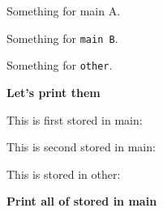 \documentclass{article}
\begin{document}
\begin{scontents}[store-env=main]
Something for main A.
\end{scontents}

\begin{scontents}[store-env=main]
Something for \verb|main B|.
\end{scontents}

\begin{scontents}[store-env=other]
Something for \verb|other|.
\end{scontents}

\textbf{Let's print them}

This is first stored in main: \par
This is second stored in main: \par
This is stored in other: 

\textbf{Print all of stored in main}\par
{}
\end{document}
